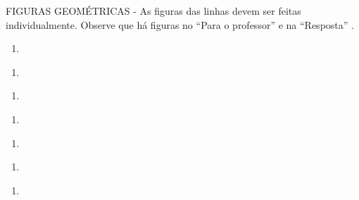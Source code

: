 \documentclass[a4,12pt]{book}
\begin{document}
\begin{imagem*}[breakable]{}{}   FIGURAS GEOMÉTRICAS - As figuras das linhas devem ser feitas individualmente. Observe que há figuras no   ``Para o professor''   e na   ``Resposta''  .
\end{imagem*}
\begin{enumerate} [\quad a)] %
  \item
\end{enumerate} %
\begin{enumerate} [\quad a)] %
  \item
\end{enumerate} %
\begin{enumerate} [\quad a)] %
  \item
\end{enumerate} %
\begin{enumerate} [\quad a)] %
  \item
\end{enumerate} %
\begin{enumerate} [\quad a)] %
  \item
\end{enumerate} %
\begin{enumerate} [\quad a)] %
  \item
\end{enumerate} %
\begin{enumerate} [\quad a)] %
  \item
\end{enumerate} %
\end{document}
